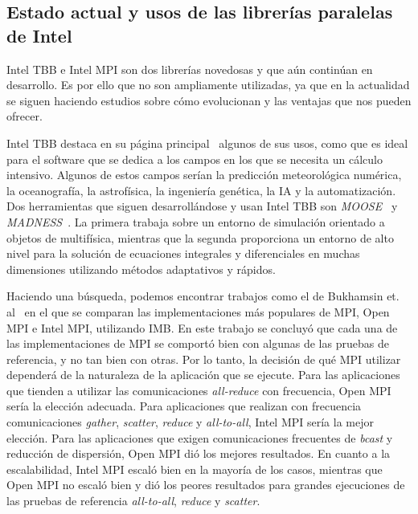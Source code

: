\documentclass[a4paper,12pt]{article}
\begin{document}



\subsection{Estado actual y usos de las librerías paralelas de Intel}

Intel TBB e Intel MPI son dos librerías novedosas y que aún continúan en desarrollo. Es por ello que no son ampliamente utilizadas, ya que en la actualidad se siguen haciendo estudios sobre cómo evolucionan y las ventajas que nos pueden ofrecer.

Intel TBB destaca en su página principal~\cite{tbb} algunos de sus usos, como que es ideal para el software que se dedica a los campos en los que se necesita un cálculo intensivo. Algunos de estos campos serían la predicción meteorológica numérica, la oceanografía, la astrofísica, la ingeniería genética, la IA y la automatización. Dos herramientas que siguen desarrollándose y usan Intel TBB son {\it MOOSE}~\cite{moose} y {\it MADNESS}~\cite{madness}. La primera trabaja sobre un entorno de simulación orientado a objetos de multifísica, mientras que la segunda proporciona un entorno de alto nivel para la solución de ecuaciones integrales y diferenciales en muchas dimensiones utilizando métodos adaptativos y rápidos.




Haciendo una búsqueda, podemos encontrar trabajos como el de Bukhamsin et. al~\cite{Bukhamsin} en el que se comparan las implementaciones más populares de MPI, Open MPI e Intel MPI, utilizando IMB. En este trabajo se concluyó que cada una de las implementaciones de MPI se comportó bien con algunas de las pruebas de referencia, y no tan bien con otras. Por lo tanto, la decisión de qué MPI utilizar dependerá de la naturaleza de la aplicación que se ejecute. Para las aplicaciones que tienden a utilizar las comunicaciones {\it all-reduce} con frecuencia, Open MPI sería la elección adecuada. Para aplicaciones que realizan con frecuencia comunicaciones {\it gather}, {\it scatter}, {\it reduce} y {\it all-to-all}, Intel MPI sería la mejor elección. Para las aplicaciones que exigen comunicaciones frecuentes de {\it bcast} y reducción de dispersión, Open MPI dió los mejores resultados. En cuanto a la escalabilidad, Intel MPI escaló bien en la mayoría de los casos, mientras que Open MPI no escaló bien y dió los peores resultados para grandes ejecuciones de las pruebas de referencia {\it all-to-all}, {\it reduce} y {\it scatter}.
\end{document}
